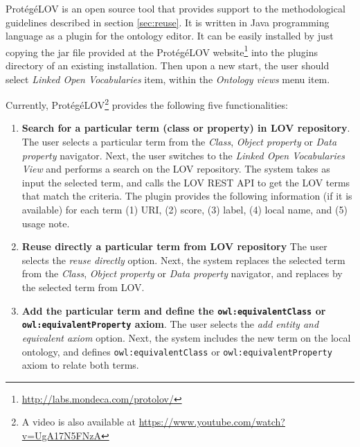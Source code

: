 Prot{\'e}g{\'e}LOV is an open source tool that provides support to the methodological guidelines described in section \ref{sec:reuse}. It is written in Java programming language as a plugin for the \protege ontology editor. It can be easily installed by just copying the jar file provided at the Prot{\'e}g{\'e}LOV website\footnote{\url{http://labs.mondeca.com/protolov/}} into the plugins directory of an existing \protege installation. Then upon a new start, the user should select \emph{Linked Open Vocabularies} item, within the \emph{Ontology views} menu item.

Currently, Prot{\'e}g{\'e}LOV\footnote{A video is also available at \url{https://www.youtube.com/watch?v=UgA17N5FNzA}} provides the following five functionalities: 

\begin{enumerate}
\vspace{-1mm}\item \textbf{Search for a particular term (class or property) in LOV repository}. 
The user selects a particular term from the \emph{Class}, \emph{Object property} or \emph{Data property} navigator. 
Next, the user switches to the \emph{Linked Open Vocabularies View} and performs a search on the LOV repository. The system takes as input the selected term, and calls the LOV REST API to get the LOV terms that match the criteria.
The plugin provides the following information (if it is available) for each term (1) URI, (2) score, (3) label, (4) local name, and (5) usage note.


\vspace{-1mm}\item \textbf{Reuse directly a particular term from LOV repository}
The user selects the \emph{reuse directly} option. Next, the system replaces the selected term from the \emph{Class}, \emph{Object property} or \emph{Data property} navigator, and replaces by the selected term from LOV.

\vspace{-1mm}\item \textbf{Add the particular term and define the {\tt owl:equivalentClass} or {\tt owl:equivalentProperty} axiom}.
The user selects the \emph{add entity and equivalent axiom} option. Next, the system includes the new term on the local ontology, and defines {\tt owl:equivalentClass} or {\tt owl:equivalentProperty} axiom to relate both terms.


\end{enumerate}
